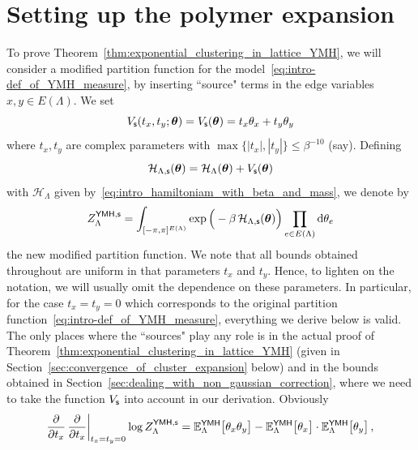 \documentclass[11pt]{article}
\theoremstyle{definition}
\theoremstyle{remark}
\numberwithin{theorem}{section}
\newcommand{\bE}{\mathbb E}
\begin{document}
    \section{Setting up the polymer expansion}
    \label{sec:setting_up_cluster_expansion}
    To prove Theorem~\ref{thm:exponential_clustering_in_lattice_YMH}, we will consider a modified partition function for the model~\eqref{eq:intro-def_of_YMH_measure}, by inserting ``source" terms in the edge variables $x,y\in E(\Lambda)$. We set 
    \begin{equation}
        \label{eq:def_of_V_s}
        V_{\sf s}(t_x,t_y;\boldsymbol{\theta}) = V_{\sf s}(\boldsymbol{\theta}) = t_x \theta_x + t_{y}\theta_y
    \end{equation}
    where $t_x,t_y$ are complex parameters with $\max\{|t_x|,|t_y|\} \le \beta^{-10}$ (say). Defining 
    \[
    \mathcal{H}_{\Lambda,{\sf s}}(\boldsymbol{\theta}) = \mathcal{H}_{\Lambda}(\boldsymbol{\theta}) + V_{\sf s}(\boldsymbol{\theta})
    \]
    with $\mathcal{H}_{\Lambda}$ given by~\eqref{eq:intro_hamiltoniam_with_beta_and_mass}, we denote by
    \begin{equation}
    \label{eq:partition_function_after_sources}
    Z_{\Lambda}^{\sf YMH,s} = \int_{[-\pi,\pi]^{E(\Lambda)}} \exp\Big(-\beta \, \mathcal{H}_{\Lambda,{\sf s}}(\boldsymbol{\theta})\Big) \prod_{e\in E(\Lambda)}  {\rm d}\theta_e
    \end{equation}
    the new modified partition function. We note that all bounds obtained throughout are uniform in that parameters $t_x$ and $t_y$. Hence, to lighten on the notation, we will usually omit the dependence on these parameters. In particular, for the case $t_x=t_y=0$ which corresponds to the original partition function~\eqref{eq:intro-def_of_YMH_measure}, everything we derive below is valid. The only places where the ``sources" play any role is in the actual proof of Theorem~\ref{thm:exponential_clustering_in_lattice_YMH} (given in Section~\ref{sec:convergence_of_cluster_expansion} below) and in the bounds obtained in Section~\ref{sec:dealing_with_non_gaussian_correction}, where we need to take the function $V_{\sf s}$ into account in our derivation. Obviously
    \begin{equation}
    \label{eq:diffrentiating_the_log_partition_function}
     \frac{\partial}{\partial t_x} \, \frac{\partial}{\partial t_x} \bigg|_{t_x=t_y=0} \log Z_{\Lambda}^{\sf YMH,s} =    \bE_{\Lambda}^{\sf YMH}\big[\theta_x \theta_y\big] - \bE_{\Lambda}^{\sf YMH}\big[\theta_x \big]\cdot \bE_{\Lambda}^{\sf YMH}\big[ \theta_y\big] \, ,
    \end{equation}
\end{document}

